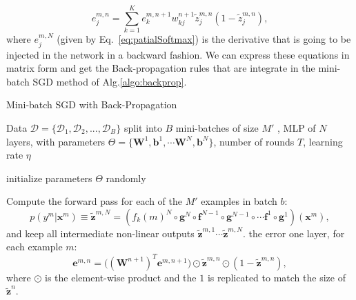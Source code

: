 \begin{equation}
e^{m,n}_j = \sum_{k=1}^K e^{m,n+1}_k w_{kj}^{n+1}\tilde{z}^{m,n}_{j}(1-\tilde{z}^{m,n}_{j}),
\end{equation}
%
\noindent where $e^{m,N}_j$ (given by Eq.~\ref{eq:patialSoftmax}) is the derivative that is going to be injected in the network in a backward fashion. 
We can express these equations in matrix form 
and get the Back-propagation rules that are integrate in the mini-batch SGD method of Alg.\ref{algo:backprop}. 

\begin{algorithm}[th!]
\label{algo:backprop}

   \caption{Mini-batch SGD with Back-Propagation \label{alg:maxent_gd}}

\begin{algorithmic}[1]

Data $\mathcal{D}=\{\mathcal{D}_1,\mathcal{D}_2,...,\mathcal{D}_B\}$ split into $B$ mini-batches of size $M'$%
, MLP of $N$ layers, with parameters $\Theta=\{\mathbf{W}^1, \mathbf{b}^1, \cdots \mathbf{W}^N, \mathbf{b}^N\}$, number of rounds $T$, learning rate $\eta$

   \STATE initialize parameters $\Theta$ randomly 


	\vspace{0.3cm}
	\STATE Compute the {forward pass} for each of the $M'$ examples in batch $b$:
    $$p(y^m|\mathbf{x}^m) \equiv \tilde{\mathbf{z}}^{m,N} = (f_k(m)^N \circ \mathbf{g}^N \circ \mathbf{f}^{N-1} \circ \mathbf{g}^{N-1} \circ \cdots \mathbf{f}^1 \circ \mathbf{g}^1)(\mathbf{x}^m),$$
	 and keep all intermediate non-linear outputs $\tilde{\mathbf{z}}^{m,1} \cdots \tilde{\mathbf{z}}^{m,N}$.
	\ENDFOR	
	\vspace{0.3cm}
		\ENDFOR	
        \ELSE
		 the error one layer, for each example $m$:  
        $$\mathbf{e}^{m,n} = \Big((\mathbf{W}^{n+1})^T \mathbf{e}^{m,n+1}\Big) \odot \tilde{\mathbf{z}}^{m,n} \odot (\mathbf{\mathrm{1}}-\tilde{\mathbf{z}}^{m,n}),$$
        where $\odot$ is the element-wise product and the $\mathbf{\mathrm{1}}$ is replicated to match the size of $\tilde{\mathbf{z}}^n$.
		\ENDFOR	
        \ENDIF 


\end{algorithmic}
\end{algorithm}
